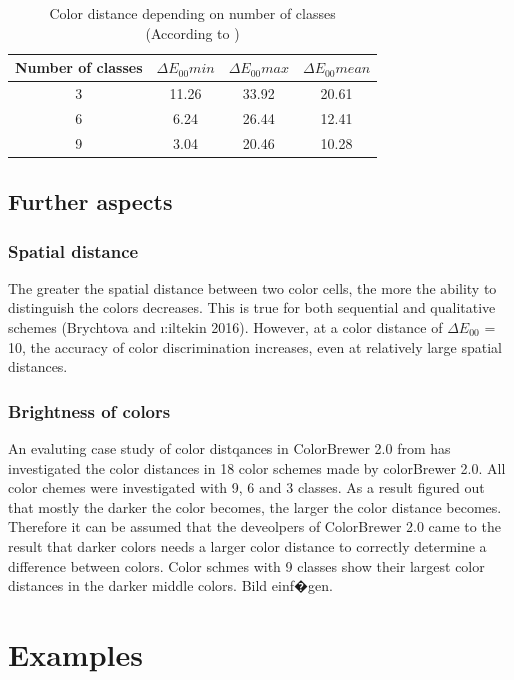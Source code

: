 \begin{table}[h!]
\centering
\caption[Color distance depending on number of classes]{Color distance depending on number of classes \\ (According to \textcite{brychtova2017})}
	\begin{tabular}{c c c c }
		\hline
		\hline
		Number of classes & $\Delta E_{00}min$ & $\Delta E_{00}max$ & $\Delta E_{00}mean$ \\ 
		\hline
		\hline
		3 & 11.26 & 33.92 & 20.61 \\  
		6 & 6.24 & 26.44 & 12.41 \\
		9 & 3.04 & 20.46 & 10.28   
	\end{tabular}
\label{tab:classes}
\end{table}

\subsection{Further aspects}

\subsubsection{Spatial distance}
The greater the spatial distance between two color cells, the more the ability to distinguish the colors decreases. This is true for both sequential and qualitative schemes (Brychtova and \i:iltekin 2016). However, at a color distance of $\Delta E_{00}$ = 10, the accuracy of color discrimination increases, even at relatively large spatial distances. 

\subsubsection{Brightness of colors}

An evaluting case study of color distqances in ColorBrewer 2.0 from \textcite{brychtova2017} has investigated the color distances in 18 color schemes made by colorBrewer 2.0. All color chemes were investigated with 9, 6 and 3 classes. As a result \textcite{brychtova2017} figured out that mostly the darker the color becomes, the larger the color distance becomes. Therefore it can be assumed that the deveolpers of ColorBrewer 2.0 came to the result that darker colors needs a larger color distance to correctly determine a difference between colors. Color schmes with 9 classes show their largest color distances in the darker middle colors.
Bild einf�gen. 


\section{Examples}
